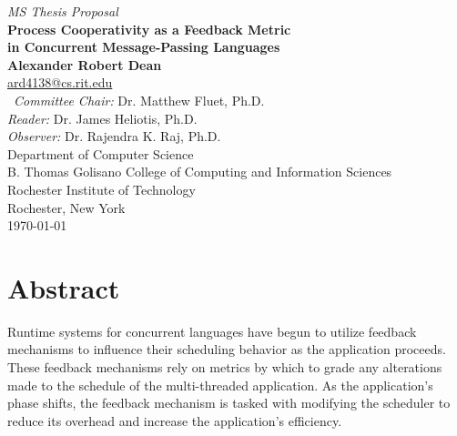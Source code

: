 \thispagestyle{empty} 
\begin{center}
{\em MS Thesis Proposal}\\
\vspace{.5in}
{\huge \bf Process Cooperativity as a Feedback Metric \\
            in Concurrent Message-Passing Languages }\\
\vspace{.5in}
{\bf Alexander Robert Dean}\\
{\footnotesize \url{ard4138@cs.rit.edu}}\\
\vspace{0.25in}
\
{\em Committee Chair:} Dr. Matthew Fluet, Ph.D.\\
\vspace{0.05in}
{\em Reader: } Dr. James Heliotis, Ph.D.\\
\vspace{0.05in}
{\em Observer: } Dr. Rajendra K. Raj, Ph.D.\\
 \vspace{0.20in}
 {\small
Department of Computer Science\\
B. Thomas Golisano College of Computing and Information Sciences \\
Rochester Institute of Technology \\
Rochester, New York }\\ [0.3in]
\vspace{0.28in}
\today{}\\
\end{center}
\vfill

\newcommand{\etc} {\emph{etc.\/}}
\newcommand{\etal}{\emph{et~al.\/}}
\newcommand{\eg}  {\emph{e.g.\/}}
\newcommand{\ie}  {\emph{i.e.\/}}


\section*{Abstract}
Runtime systems for concurrent languages have begun to utilize feedback mechanisms to influence their
scheduling behavior as the application proceeds. These feedback mechanisms rely on metrics by which to
grade any alterations made to the schedule of the multi-threaded application. As the application's phase shifts, the feedback mechanism
is tasked with modifying the scheduler to reduce its overhead and increase the application's efficiency.

